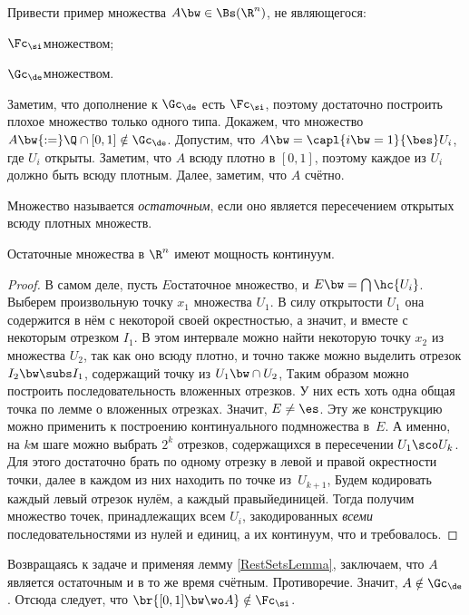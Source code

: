 \documentclass[a4paper,draft]{article}
\begin{document}
\begin{problem}
  Привести пример множества $A \bw\in \Bs(\R^n)$, не являющегося:
  \begin{items}{-3}
     \item $\Fc_\si$\д множеством;
     \item $\Gc_\de$\д множеством.
  \end{items}
\end{problem}
\begin{solution}
  Заметим, что дополнение к $\Gc_\de$ есть $\Fc_\si$, поэтому достаточно построить плохое множество только
  одного типа. Докажем, что множество $A \bw{:=} \Q \cap [0,1] \notin \Gc_\de$. Допустим, что
  $A \bw= \capl{i\bw=1}{\bes} U_i$, где $U_i$ открыты. Заметим, что $A$ всюду плотно
  в $[0,1]$, поэтому каждое из $U_i$ должно быть всюду плотным. Далее, заметим, что $A$ счётно.


\begin{df}
  Множество называется \emph{остаточным}, если оно является пересечением открытых всюду плотных множеств.
\end{df}

\begin{lemma}
  \label{RestSetsLemma}Остаточные множества в $\R^n$ имеют мощность континуум.
\end{lemma}
\begin{proof}
  В самом деле, пусть $E$\т остаточное множество, и $E \bw= \bigcap \hc{U_i}$. Выберем произвольную
  точку $x_1$ множества $U_1$. В силу открытости $U_1$ она содержится в нём с некоторой своей
  окрестностью, а значит, и вместе с некоторым отрезком $I_1$. В этом интервале можно найти
  некоторую точку $x_2$ из множества $U_2$, так как оно всюду плотно, и точно также можно
  выделить отрезок $I_2 \bw\subs I_1$, содержащий точку из $U_1 \bw\cap U_2$,  Таким
  образом можно построить последовательность вложенных отрезков. У них есть хоть одна общая
  точка по лемме о вложенных отрезках. Значит, $E \neq \es$. Эту же конструкцию можно применить
  к построению континуального подмножества в~$E$. А именно, на $k$\д м шаге можно выбрать $2^k$
  отрезков, содержащихся в пересечении $U_1 \sco U_k$. Для этого достаточно брать по одному
  отрезку в левой и правой окрестности точки, далее в каждом из них находить по точке
  из~$U_{k+1}$,  Будем кодировать каждый левый отрезок нулём, а каждый правый\т единицей.
  Тогда получим множество точек, принадлежащих всем $U_i$, закодированных \emph{всеми}
  последовательностями из нулей и единиц, а их континуум, что и требовалось.
\end{proof}

  Возвращаясь к задаче и применяя лемму \ref{RestSetsLemma}, заключаем, что $A$ является
  остаточным и в то же время счётным. Противоречие. Значит, $A \notin \Gc_\de$. Отсюда
  следует, что $\br{[0,1]\bw\wo A} \notin \Fc_\si$.
\end{solution}
\end{document}
